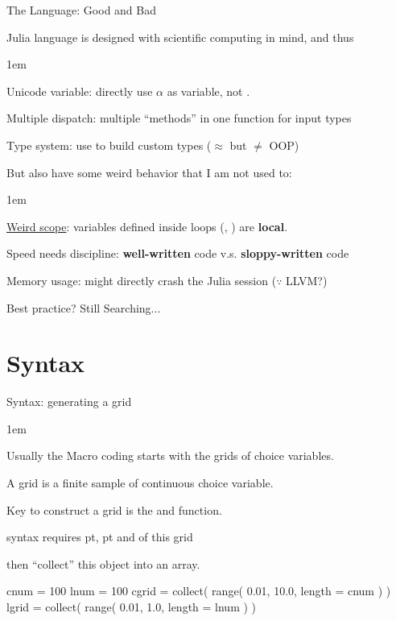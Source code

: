 \documentclass[11pt,aspectratio=43,usenames,dvipsnames]{beamer}
\newcommand{\blue}[1]{\textcolor{blue}{#1}}
\let\olditemize=\itemize
\let\endolditemize=\enditemize
\renewenvironment{itemize}{\olditemize \itemsep1em}{\endolditemize}
\theoremstyle{definition}
\begin{document}
\begin{frame}{The Language: Good and Bad}
\label{slide:The_Language__Good_and_Bad}

Julia language is designed with scientific computing in mind, and thus

\begin{itemize}
    \item Unicode variable: directly use $ \alpha $ as variable, not .
    \item Multiple dispatch: multiple ``methods'' in one function for input types
    \item Type system: use  to build custom types ($\approx$ but $\neq$ OOP)
\end{itemize}

But also have some weird behavior that I am not used to:

\begin{itemize}
    \item \blue{\href{https://craftofcoding.wordpress.com/2021/02/12/what-i-really-dislike-about-julia-its-scope/}{Weird scope}}: variables defined inside loops (, ) are \textbf{local}.
    \item Speed needs discipline: \textbf{well-written} code v.s. \textbf{sloppy-written} code
    \item Memory usage: might directly crash the Julia session ($\because$ LLVM?)
\end{itemize}

Best practice? \hspace{2.5cm} Still Searching...

\end{frame}

\section{Syntax}
\label{sec:Syntax}

\begin{frame}[fragile]{Syntax: generating a grid}
\label{slide:Syntax__generating_a_grid}

\begin{itemize}
    \item Usually the Macro coding starts with the grids of choice variables.
    \item A grid is a finite sample of continuous choice variable.
    \item Key to construct a grid is the  and  function.
    \item {} syntax requires  pt,  pt and  of this grid
    \item {} then ``collect'' this  object into an array.
\end{itemize}


\begin{juliacode}
    cnum = 100
    lnum = 100
    cgrid = collect( range( 0.01, 10.0, length = cnum ) )
    lgrid = collect( range( 0.01, 1.0, length = lnum ) )
\end{juliacode}
\end{frame}
\end{document}
